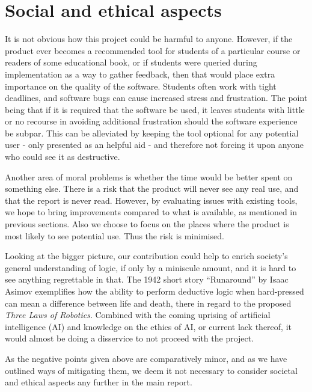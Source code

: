 
\section{Social and ethical aspects}

It is not obvious how this project could be harmful to anyone. However, if the product ever becomes a recommended tool for students of a particular course or readers of some educational book, or if students were queried during implementation as a way to gather feedback, then that would place extra importance on the quality of the software. Students often work with tight deadlines, and software bugs can cause increased stress and frustration. The point being that if it is required that the software be used, it leaves students with little or no recourse in avoiding additional frustration should the software experience be subpar. This can be alleviated by keeping the tool optional for any potential user - only presented as an helpful aid - and therefore not forcing it upon anyone who could see it as destructive.

Another area of moral problems is whether the time would be better spent on
something else. There is a risk that the product will never see any real use, and that the report is never read. However, by evaluating issues with existing tools, we hope to bring improvements compared to what is available, as mentioned in previous sections. Also we choose to focus on the places where the product is most likely to see potential use. Thus the risk is minimised.

Looking at the bigger picture, our contribution could help to enrich society's general understanding of logic, if only by a miniscule amount, and it is hard to see anything regrettable in that. The 1942 short story ``Runaround'' by Isaac Asimov \autocite{asimov50} exemplifies how the ability to perform deductive logic when hard-pressed can mean a difference between life and
death, there in regard to the proposed \emph{Three Laws of Robotics}. Combined
with the coming uprising of artificial intelligence (AI) and knowledge on the
ethics of AI, or current lack thereof, it would almost be doing a disservice to
not proceed with the project.

As the negative points given above are comparatively minor, and as we have outlined ways of mitigating them, we deem it not necessary to consider societal and ethical aspects any further in the main report.
